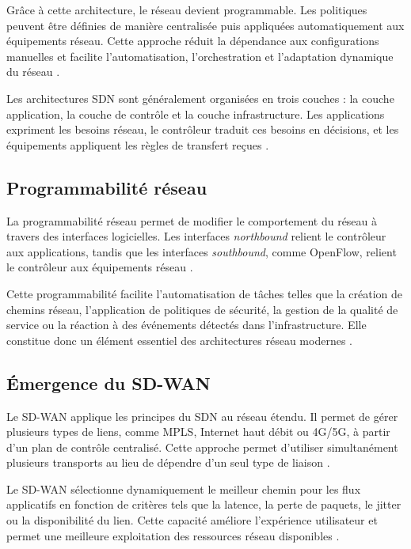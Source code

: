 \documentclass[12pt,a4paper,oneside]{report}
\begin{document}
	Grâce à cette architecture, le réseau devient programmable. Les politiques peuvent être définies de manière centralisée puis appliquées automatiquement aux équipements réseau. Cette approche réduit la dépendance aux configurations manuelles et facilite l'automatisation, l'orchestration et l'adaptation dynamique du réseau \cite{onf_sdn_arch,kreutz_sdn_survey}.
	
	Les architectures SDN sont généralement organisées en trois couches : la couche application, la couche de contrôle et la couche infrastructure. Les applications expriment les besoins réseau, le contrôleur traduit ces besoins en décisions, et les équipements appliquent les règles de transfert reçues \cite{onf_sdn_arch}.
	
	\subsection{Programmabilité réseau}
	
	La programmabilité réseau permet de modifier le comportement du réseau à travers des interfaces logicielles. Les interfaces \textit{northbound} relient le contrôleur aux applications, tandis que les interfaces \textit{southbound}, comme OpenFlow, relient le contrôleur aux équipements réseau \cite{onf_sdn_arch}.
	
	Cette programmabilité facilite l'automatisation de tâches telles que la création de chemins réseau, l'application de politiques de sécurité, la gestion de la qualité de service ou la réaction à des événements détectés dans l'infrastructure. Elle constitue donc un élément essentiel des architectures réseau modernes \cite{kreutz_sdn_survey}.
	
	\subsection{Émergence du SD-WAN}
	
	Le SD-WAN applique les principes du SDN au réseau étendu. Il permet de gérer plusieurs types de liens, comme MPLS, Internet haut débit ou 4G/5G, à partir d'un plan de contrôle centralisé. Cette approche permet d'utiliser simultanément plusieurs transports au lieu de dépendre d'un seul type de liaison \cite{cisco_sdw_design}.
	
	Le SD-WAN sélectionne dynamiquement le meilleur chemin pour les flux applicatifs en fonction de critères tels que la latence, la perte de paquets, le jitter ou la disponibilité du lien. Cette capacité améliore l'expérience utilisateur et permet une meilleure exploitation des ressources réseau disponibles \cite{cisco_sdw_design,cisco_sdw_overview}.
	
\end{document}
